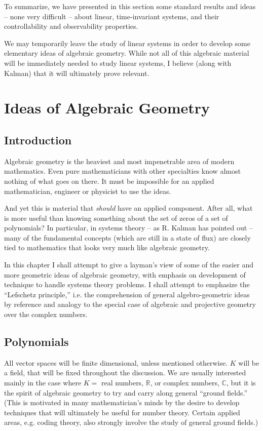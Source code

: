 \documentclass[12pt]{book}
\theoremstyle{plain}
\theoremstyle{definition}
\begin{document}
To summarize, we have presented in this section some standard results and ideas -- none very difficult -- about linear, time-invariant systems, and their controllability and observability properties.

We may temporarily leave the study of linear systems in order to develop some elementary ideas of algebraic geometry.
While not all of this algebraic material will be immediately needed to study linear systems, I believe (along with Kalman) that it will ultimately prove relevant.

\chapter{Ideas of Algebraic Geometry}

\section{Introduction}

Algebraic geometry is the heaviest and most impenetrable area of modern mathematics.
Even pure mathematicians with other specialties know almost nothing of what goes on there.
It must be impossible for an applied mathematician, engineer or physicist to use the ideas.

And yet this is material that \emph{should} have an applied component.
After all, what is more useful than knowing something about the set of zeros of a set of polynomials?
In particular, in systems theory -- as R. Kalman has pointed out -- many of the fundamental concepts (which are still in a state of flux) are closely tied to mathematics that looks very much like algebraic geometry.

In this chapter I shall attempt to give a layman's view of some of the easier and more geometric ideas of algebraic geometry, with emphasis on development of technique to handle systems theory problems.
I shall attempt to emphasize the ``Lefschetz principle,'' i.e. the comprehension of general algebro-geometric ideas by reference and analogy to the special case of algebraic and projective geometry over the complex numbers.

\section{Polynomials}

All vector spaces will be finite dimensional, unless mentioned otherwise.
$K$ will be a field, that will be fixed throughout the discussion.
We are usually interested mainly in the case where $K = $ real numbers, $\mathbb{R}$, or complex numbers, $\mathbb{C}$, but it is the spirit of algebraic geometry to try and carry along general ``ground fields.''
(This is motivated in many mathematician's minds by the desire to develop techniques that will ultimately be useful for number theory.
Certain applied areas, e.g. coding theory, also strongly involve the study of general ground fields.)
\end{document}
